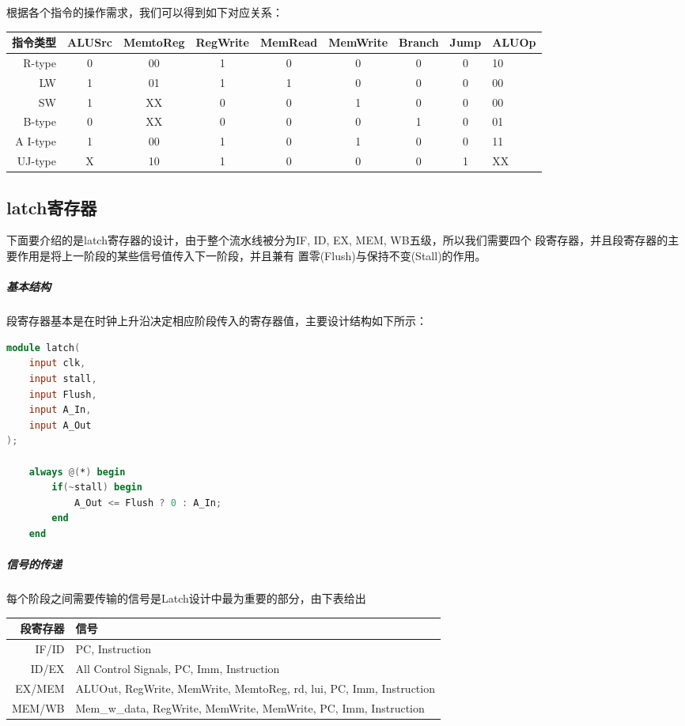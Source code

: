 根据各个指令的操作需求，我们可以得到如下对应关系：\\

\scalebox{0.9}
{
\begin{tabular}{|r|c|c|c|c|c|c|c|l|}
    \hline
    指令类型      & ALUSrc & MemtoReg & RegWrite & MemRead & MemWrite & Branch & Jump & ALUOp \\
    \hline
    R-type       & 0 & 00 & 1 & 0 & 0 & 0 & 0 & 10 \\
    \hline
    LW           & 1 & 01 & 1 & 1 & 0 & 0 & 0 & 00 \\
    \hline
    SW           & 1 & XX & 0 & 0 & 1 & 0 & 0 & 00 \\
    \hline
    B-type       & 0 & XX & 0 & 0 & 0 & 1 & 0 & 01 \\
    \hline
    A I-type     & 1 & 00 & 1 & 0 & 1 & 0 & 0 & 11 \\ %
    \hline
    UJ-type      & X & 10 & 1 & 0 & 0 & 0 & 1 & XX \\
    \hline  
\end{tabular} 
}

\subsection{latch寄存器}
下面要介绍的是latch寄存器的设计，由于整个流水线被分为IF, ID, EX, MEM, WB五级，所以我们需要四个
段寄存器，并且段寄存器的主要作用是将上一阶段的某些信号值传入下一阶段，并且兼有
置零(Flush)与保持不变(Stall)的作用。

\subparagraph{基本结构} 
段寄存器基本是在时钟上升沿决定相应阶段传入的寄存器值，主要设计结构如下所示：

\begin{lstlisting}[language = {verilog}]
module latch(
    input clk,
    input stall,
    input Flush,
    input A_In,
    input A_Out
);    

    always @(*) begin
        if(~stall) begin
            A_Out <= Flush ? 0 : A_In;
        end
    end
\end{lstlisting}

\subparagraph{信号的传递}
每个阶段之间需要传输的信号是Latch设计中最为重要的部分，由下表给出 \\

\begin{tabular}{|r|l|}
    \hline
    段寄存器 & 信号 \\
    \hline
    IF/ID  & PC, Instruction \\
    \hline
    ID/EX  & All Control Signals, PC, Imm, Instruction \\
    \hline
    EX/MEM & ALUOut, RegWrite, MemWrite, MemtoReg, rd, lui, PC, Imm, Instruction \\
    \hline
    MEM/WB & Mem\_w\_data, RegWrite, MemWrite, MemWrite, PC, Imm, Instruction \\
    \hline
\end{tabular} \\

